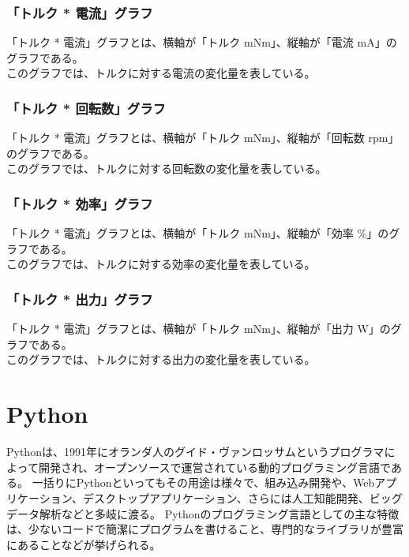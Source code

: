 \subsubsection{「トルク * 電流」グラフ}\label{sub:sub:torden}
「トルク * 電流」グラフとは、横軸が「トルク mNm」、縦軸が「電流 mA」のグラフである。\\
このグラフでは、トルクに対する電流の変化量を表している。
\subsubsection{「トルク * 回転数」グラフ}\label{sub:sub:torkaiten}
「トルク * 電流」グラフとは、横軸が「トルク mNm」、縦軸が「回転数 rpm」のグラフである。\\
このグラフでは、トルクに対する回転数の変化量を表している。
\subsubsection{「トルク * 効率」グラフ}\label{sub:sub:torkouritu}
「トルク * 電流」グラフとは、横軸が「トルク mNm」、縦軸が「効率 \%」のグラフである。\\
このグラフでは、トルクに対する効率の変化量を表している。
\subsubsection{「トルク * 出力」グラフ}\label{sub:sub:torsyutu}
「トルク * 電流」グラフとは、横軸が「トルク mNm」、縦軸が「出力 W」のグラフである。\\
このグラフでは、トルクに対する出力の変化量を表している。
  \section{Python}\label{python}
Pythonは、1991年にオランダ人のグイド・ヴァンロッサムというプログラマによって開発され、オープンソースで運営されている動的プログラミング言語である\cite{pythonoya}。
一括りにPythonといってもその用途は様々で、組み込み開発や、Webアプリケーション、デスクトップアプリケーション、さらには人工知能開発、ビッグデータ解析などと多岐に渡る\cite{pythonsamu}。
Pythonのプログラミング言語としての主な特徴は、少ないコードで簡潔にプログラムを書けること、専門的なライブラリが豊富にあることなどが挙げられる。

